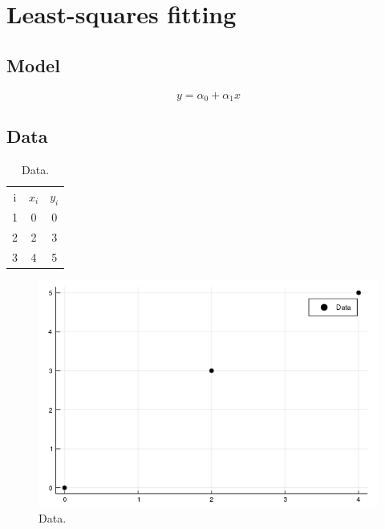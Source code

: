 \documentclass[12pt]{article}
\begin{document}
\section{Least-squares fitting}

\subsection{Model}

\begin{equation}
y=\alpha_{0}+\alpha_{1}x
\end{equation}

\subsection{Data}

\begin{table}[ht]
\begin{centering}
\begin{tabular}{ccc}
i & $x_{i}$ & $y_{i}$\\
1 & 0 & 0 \\
2 & 2 & 3 \\
3 & 4 & 5 \\
\end{tabular}
\par\end{centering}
\caption{Data.}
\end{table}

\begin{figure}[ht]
\begin{centering}
\includegraphics[width=\columnwidth]{data.png}
\end{centering}
\caption{Data.}
\end{figure}
\end{document}
